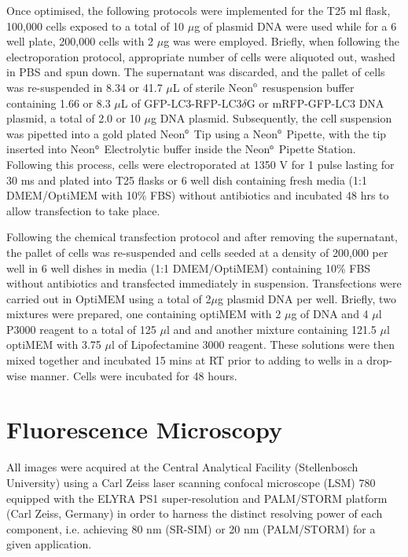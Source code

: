 Once optimised, the following protocols were implemented for the T25 ml flask, 100,000 cells exposed to a total of 10 $\mu$g of plasmid DNA were used while for a 6 well plate, 200,000 cells with 2 $\mu$g was were employed. Briefly, when following the electroporation protocol, appropriate number of cells were aliquoted out, washed in PBS and spun down. The supernatant was discarded, and the pallet of cells was re-suspended in 8.34 or 41.7 $\mu$L of sterile Neon${\textsuperscript{\tiny{\textregistered}}}$ resuspension buffer containing 1.66 or 8.3 $\mu$L of GFP-LC3-RFP-LC3$\delta$G or mRFP-GFP-LC3 DNA plasmid, a total of 2.0 or 10 $\mu$g DNA plasmid. Subsequently, the cell suspension was pipetted into a gold plated Neon${\textsuperscript{\tiny{\textregistered}}}$ Tip using a Neon${\textsuperscript{\tiny{\textregistered}}}$ Pipette, with the tip inserted into Neon${\textsuperscript{\tiny{\textregistered}}}$ Electrolytic buffer inside the Neon${\textsuperscript{\tiny{\textregistered}}}$ Pipette Station. Following this process, cells were electroporated at 1350 V for 1 pulse lasting for 30 ms and plated into T25 flasks or 6 well dish containing fresh media (1:1 DMEM/OptiMEM with 10\% FBS) without antibiotics and incubated 48 hrs to allow transfection to take place.

Following the chemical transfection protocol and after removing the supernatant, the pallet of cells was re-suspended and cells seeded at a density of 200,000 per well in 6 well dishes in media (1:1 DMEM/OptiMEM) containing 10\% FBS without antibiotics and transfected immediately in suspension. Transfections were carried out in OptiMEM using a total of 2$\mu$g plasmid DNA per well. Briefly, two mixtures were prepared, one containing optiMEM with 2 $\mu$g of DNA and 4 $\mu$l P3000 reagent to a total of 125 $\mu$l and and another mixture containing 121.5 $\mu$l optiMEM with 3.75 $\mu$l of Lipofectamine 3000 reagent.  These solutions were then mixed together and incubated 15 mins at RT prior to adding to wells in a drop-wise manner. Cells were incubated for 48 hours. 

\section{Fluorescence Microscopy}
All images were acquired at the Central Analytical Facility (Stellenbosch University) using a Carl Zeiss laser scanning confocal microscope (LSM) 780 equipped with the ELYRA PS1 super-resolution and PALM/STORM platform (Carl Zeiss, Germany) in order to harness the distinct resolving power of each component, i.e. achieving 80 nm (SR-SIM) or 20 nm (PALM/STORM) for a given application.

